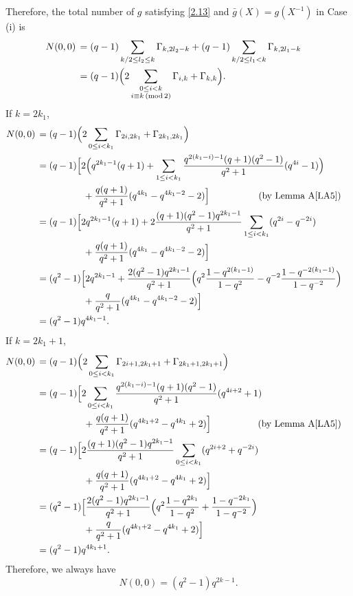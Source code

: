 \documentclass{amsart}
\numberwithin{equation}{section}
\theoremstyle{definition}
\begin{document}
Therefore, the total number of $g$ satisfying \eqref{2.13} and $\bar g(X)=g(X^{-1})$ in Case (i) is
\begin{align*}
N(0,0)\,&=(q-1)\sum_{k/2\le l_2\le k}\Gamma_{k,2l_2-k}+(q-1)\sum_{k/2\le l_1< k}\Gamma_{k,2l_1-k}\cr
&=(q-1)\Bigl(2\sum_{\substack{0\le i<k\cr i\equiv k\,(\text{mod}\,2)}}\Gamma_{i,k}+\Gamma_{k,k}\Bigr).
\end{align*}
If $k=2k_1$,
\begin{align*}
N(0,0)\,&=(q-1)\Bigl(2\sum_{0\le i<k_1}\Gamma_{2i,2k_1}+\Gamma_{2k_1,2k_1}\Bigr)\cr
&=(q-1)\Bigl[2\Bigl(q^{2k_1-1}(q+1)+\sum_{1\le i<k_1}\frac{q^{2(k_1-i)-1}(q+1)(q^2-1)}{q^2+1}(q^{4i}-1)\Bigr)\cr
&\kern 5em +\frac{q(q+1)}{q^2+1}(q^{4k_1}-q^{4k_1-2}-2)\Bigr]\kern5.3em\text{(by Lemma~A\ref{LA5})}\cr
&=(q-1)\Bigl[2q^{2k_1-1}(q+1)+2\frac{(q+1)(q^2-1)q^{2k_1-1}}{q^2+1}\sum_{1\le i<k_1}(q^{2i}-q^{-2i})\cr
&\kern 5em +\frac{q(q+1)}{q^2+1}(q^{4k_1}-q^{4k_1-2}-2)\Bigr]\cr
&=(q^2-1)\Bigl[2q^{2k_1-1}+\frac{2(q^2-1)q^{2k_1-1}}{q^2+1}\Bigl(q^2\frac{1-q^{2(k_1-1)}}{1-q^{2}}-q^{-2}\frac{1-q^{-2(k_1-1)}}{1-q^{-2}}\Bigr)\cr
&\kern 5em +\frac{q}{q^2+1}(q^{4k_1}-q^{4k_1-2}-2)\Bigr]\cr
&=(q^2-1)q^{4k_1-1}.
\end{align*}
If $k=2k_1+1$,
\begin{align*}
N(0,0)\,&=(q-1)\Bigl(2\sum_{0\le i<k_1}\Gamma_{2i+1,2k_1+1}+\Gamma_{2k_1+1,2k_1+1}\Bigr)\cr
&=(q-1)\Bigl[2\sum_{0\le i<k_1}\frac{q^{2(k_1-i)-1}(q+1)(q^2-1)}{q^2+1}(q^{4i+2}+1)\cr
&\kern 5em +\frac{q(q+1)}{q^2+1}(q^{4k_1+2}-q^{4k_1}+2)\Bigr] \kern5em\text{(by Lemma~A\ref{LA5})}\cr
&=(q-1)\Bigl[2\frac{(q+1)(q^2-1)q^{2k_1-1}}{q^2+1}\sum_{0\le i<k_1}(q^{2i+2}+q^{-2i})\cr
&\kern 5em +\frac{q(q+1)}{q^2+1}(q^{4k_1+2}-q^{4k_1}+2)\Bigr]\cr
&=(q^2-1)\Bigl[\frac{2(q^2-1)q^{2k_1-1}}{q^2+1}\Bigl( q^2\frac{1-q^{2k_1}}{1-q^2}+\frac{1-q^{-2k_1}}{1-q^{-2}}\Bigr)\cr
&\kern 5em +\frac{q}{q^2+1}(q^{4k_1+2}-q^{4k_1}+2)\Bigr]\cr
&=(q^2-1)q^{4k_1+1}.
\end{align*}
Therefore, we always have
\begin{equation}\label{case1}
N(0,0)=(q^2-1)q^{2k-1}.
\end{equation}

\medskip
\end{document}
